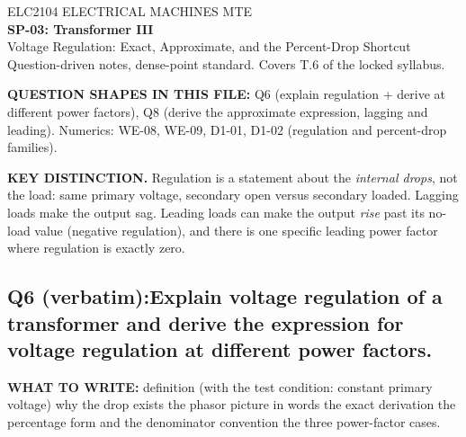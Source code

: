 \documentclass[11pt]{article}
\newcommand{\qhead}[2]{\subsection*{\color{copper}#1\quad\color{iron}#2}}
\newcommand{\tagline}[1]{\textbf{\color{copper}#1}}
\newcommand{\keydist}[1]{\vspace{2pt}\textbf{\color{red}KEY DISTINCTION.} #1}
\begin{document}
\begin{center}
{\footnotesize\color{copper} ELC2104 \textbar{} ELECTRICAL MACHINES \textbar{} MTE}\\[6pt]
{\LARGE\bfseries\color{iron} SP-03: Transformer III}\\[2pt]
{\Large\color{copper} Voltage Regulation: Exact, Approximate, and the Percent-Drop Shortcut}\\[6pt]
{\footnotesize\color{muted} Question-driven notes, dense-point standard. Covers T.6 of the locked syllabus.}
\end{center}

\vspace{2pt}
\tagline{QUESTION SHAPES IN THIS FILE:} Q6 (explain regulation + derive at different power factors), Q8 (derive the approximate expression, lagging and leading). Numerics: WE-08, WE-09, D1-01, D1-02 (regulation and percent-drop families).
\vspace{2pt}

\keydist{Regulation is a statement about the \emph{internal drops}, not the load: same primary voltage, secondary open versus secondary loaded. Lagging loads make the output sag. Leading loads can make the output \emph{rise} past its no-load value (negative regulation), and there is one specific leading power factor where regulation is exactly zero.}

\hrulefill

\qhead{Q6 (verbatim):}{Explain voltage regulation of a transformer and derive the expression for voltage regulation at different power factors.}

\tagline{WHAT TO WRITE:} definition (with the test condition: constant primary voltage) \textrightarrow{} why the drop exists \textrightarrow{} the phasor picture in words \textrightarrow{} the exact derivation \textrightarrow{} the percentage form and the denominator convention \textrightarrow{} the three power-factor cases.
\end{document}

